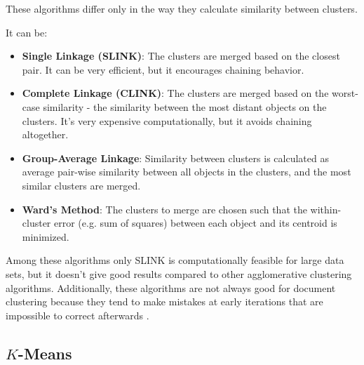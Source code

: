 These algorithms differ only in the way they calculate
similarity between clusters.

It can be:

\begin{itemize}
\itemsep1pt\parskip0pt
  \item \textbf{Single Linkage (SLINK)}: The clusters are merged based
on the closest pair. It can be very efficient, but it encourages
chaining behavior.


  \item \textbf{Complete Linkage (CLINK)}: The clusters are merged
  based on the worst-case similarity - the similarity between the most
  distant objects on the clusters. It's very expensive computationally,
  but it avoids chaining altogether.


  \item \textbf{Group-Average Linkage}: Similarity between clusters
  is calculated as average pair-wise similarity between all objects
  in the clusters, and the most similar clusters are merged.

  \item \textbf{Ward's Method}: The clusters to merge are chosen such that the within-cluster
  error (e.g. sum of squares) between each object and its centroid
  is minimized.


\end{itemize}


Among these algorithms only SLINK is computationally feasible
for large data sets, but it doesn't give good results compared to other
agglomerative clustering algorithms. Additionally, these algorithms
are not always good for document clustering because they tend to
make mistakes at early iterations that are impossible to correct
afterwards \cite{steinbach2000comparison}.



\subsection{$K$-Means} \label{sec:kmeans}

